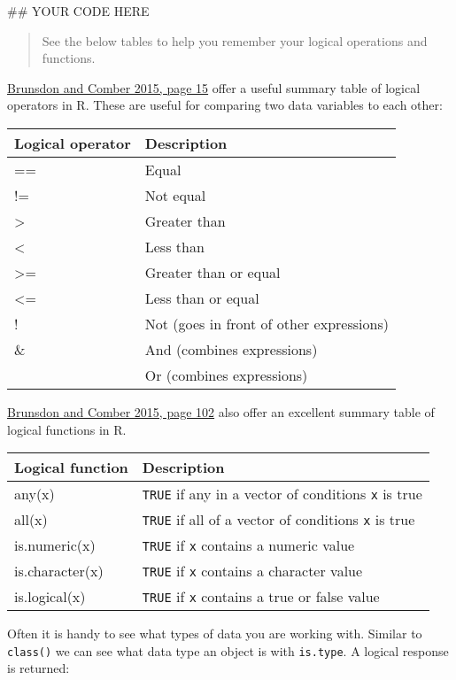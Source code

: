\documentclass[]{article}
\newenvironment{Shaded}{\begin{snugshade}}{\end{snugshade}}
\newcommand{\NormalTok}[1]{#1}
\begin{document}
\begin{Shaded}
\begin{Highlighting}[]
\NormalTok{## YOUR CODE HERE}
\end{Highlighting}
\end{Shaded}

\begin{quote}
See the below tables to help you remember your logical operations and
functions.
\end{quote}

\href{https://us.sagepub.com/en-us/nam/an-introduction-to-r-for-spatial-analysis-and-mapping/book241031}{Brunsdon
and Comber 2015, page 15} offer a useful summary table of logical
operators in R. These are useful for comparing two data variables to
each other:

\begin{longtable}[]{@{}ll@{}}
\toprule
Logical operator & Description\tabularnewline
\midrule
\endhead
== & Equal\tabularnewline
!= & Not equal\tabularnewline
\textgreater{} & Greater than\tabularnewline
\textless{} & Less than\tabularnewline
\textgreater{}= & Greater than or equal\tabularnewline
\textless{}= & Less than or equal\tabularnewline
! & Not (goes in front of other expressions)\tabularnewline
\& & And (combines expressions)\tabularnewline
\texttt{\textbar{}} & Or (combines expressions)\tabularnewline
\bottomrule
\end{longtable}

\href{https://us.sagepub.com/en-us/nam/an-introduction-to-r-for-spatial-analysis-and-mapping/book241031}{Brunsdon
and Comber 2015, page 102} also offer an excellent summary table of
logical functions in R.

\begin{longtable}[]{@{}ll@{}}
\toprule
Logical function & Description\tabularnewline
\midrule
\endhead
any(x) & \texttt{TRUE} if any in a vector of conditions \texttt{x} is
true\tabularnewline
all(x) & \texttt{TRUE} if all of a vector of conditions \texttt{x} is
true\tabularnewline
is.numeric(x) & \texttt{TRUE} if \texttt{x} contains a numeric
value\tabularnewline
is.character(x) & \texttt{TRUE} if \texttt{x} contains a character
value\tabularnewline
is.logical(x) & \texttt{TRUE} if \texttt{x} contains a true or false
value\tabularnewline
\bottomrule
\end{longtable}

Often it is handy to see what types of data you are working with.
Similar to \texttt{class()} we can see what data type an object is with
\texttt{is.type}. A logical response is returned:
\end{document}

